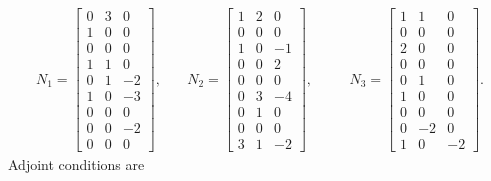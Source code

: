 \documentclass[11pt,reqno,oneside,a4paper]{article}
\theoremstyle{plain} %
\theoremstyle{definition}
\theoremstyle{remark}
\begin{document}
\begin{equation*}
\begin{aligned}
N_1 = \begin{bmatrix} 0 & 3 & 0 \\ 1 & 0 & 0 \\ 0 & 0 & 0 \\ 1 & 1 & 0 \\ 0 & 1 & -2 \\ 1 & 0 & -3 \\ 0 & 0 & 0 \\ 0 & 0 & -2 \\ 0 & 0 & 0 \end{bmatrix}, &\quad N_2 = \begin{bmatrix} 1 & 2 & 0 \\ 0 & 0 & 0 \\ 1 & 0 & -1 \\ 0 & 0 & 2 \\ 0 & 0 & 0 \\ 0 & 3 & -4 \\ 0 & 1 & 0 \\ 0 & 0 & 0 \\ 3 & 1 &-2 \end{bmatrix}, &&\quad N_3 = \begin{bmatrix} 1 & 1 & 0 \\ 0 & 0 & 0 \\ 2 & 0 & 0 \\ 0 & 0 & 0 \\ 0 & 1 & 0 \\ 1 & 0 & 0 \\ 0 & 0 & 0 \\ 0 & -2 & 0 \\ 1 & 0 & -2 \end{bmatrix}. 
\end{aligned}
\end{equation*}
Adjoint conditions are
\end{document}

